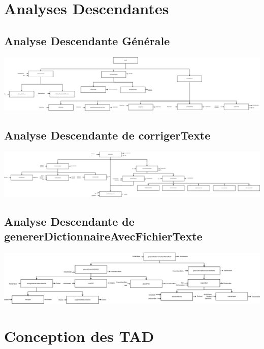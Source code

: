 \documentclass{article}
\begin{document}
\clearpage
\section{Analyses Descendantes}
  \subsection{Analyse Descendante Générale}
  \includegraphics[width=1\textwidth]{AD/AnalyseDescendante.eps}
  \subsection{Analyse Descendante de corrigerTexte}
  \includegraphics[width=1\textwidth]{AD/corrigerTexte.eps}
  \subsection{Analyse Descendante de genererDictionnaireAvecFichierTexte}
  \includegraphics[width=1\textwidth]{AD/genererDictionnaireAvecFichierTexte.eps}

\clearpage
\section{Conception des TAD}
	
	
	\clearpage

	
	\clearpage

	
	\clearpage

	
\end{document}
